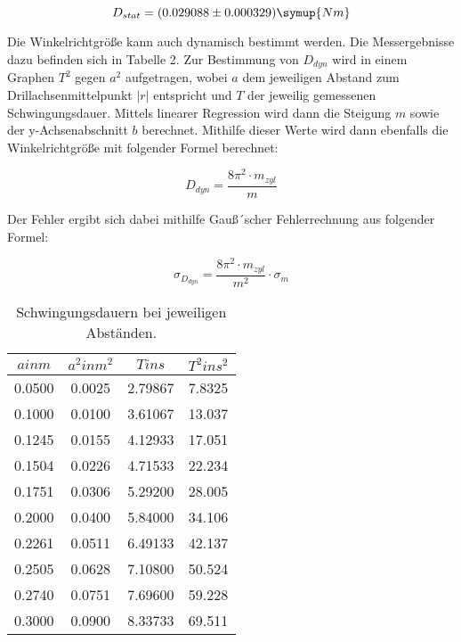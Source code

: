 \begin{equation}
  D_{stat} = (0.029088 \pm 0.000329) \symup{Nm}
\end{equation}

Die Winkelrichtgröße kann auch dynamisch bestimmt werden. Die Messergebnisse dazu befinden sich
in Tabelle 2. Zur Bestimmung von $D_{dyn}$ wird in einem Graphen $T^2$ gegen $a^2$ aufgetragen,
wobei $a$ dem jeweiligen Abstand zum Drillachsenmittelpunkt $\lvert r \rvert$ entspricht und $T$
der jeweilig gemessenen Schwingungsdauer. Mittels linearer Regression wird dann die Steigung $m$ sowie
der y-Achsenabschnitt $b$ berechnet. Mithilfe dieser Werte wird dann ebenfalls die
Winkelrichtgröße mit folgender Formel berechnet:

\begin{equation}
  D_{dyn} = \frac{8\pi^2 \cdot m_{zyl}}{m}
\end{equation}

Der Fehler ergibt sich dabei mithilfe Gauß´scher Fehlerrechnung aus folgender Formel:

\begin{equation}
  \sigma_{D_{dyn}} = \frac{8 \pi^2 \cdot m_{zyl}}{m^2} \cdot \sigma_m
\end{equation}

\begin{table}
  \centering
  \caption{Schwingungsdauern bei jeweiligen Abständen.}
  \label{tab:data2}
  \begin{tabular}{c c c c }
    \toprule $a in m$ & $a^2 in m^2$ & $T in s$ & $T^2 in s^2$ \\
    \midrule
    0.0500 & 0.0025 & 2.79867 &  7.8325\\
    0.1000 & 0.0100 & 3.61067 &  13.037\\
    0.1245 & 0.0155 & 4.12933 &  17.051\\
    0.1504 & 0.0226 & 4.71533 &  22.234\\
    0.1751 & 0.0306 & 5.29200 &  28.005\\
    0.2000 & 0.0400 & 5.84000 &  34.106\\
    0.2261 & 0.0511 & 6.49133 &  42.137\\
    0.2505 & 0.0628 & 7.10800 &  50.524\\
    0.2740 & 0.0751 & 7.69600 &  59.228\\
    0.3000 & 0.0900 & 8.33733 &  69.511\\
    \bottomrule
  \end{tabular}
\end{table}

